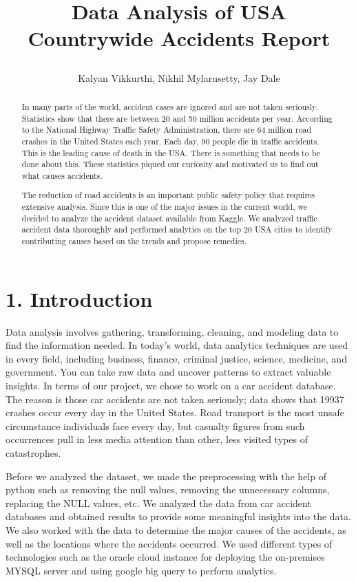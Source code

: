 \documentclass[10pt,twocolumn,letterpaper]{article}
\title{
		\usefont{OT1}{bch}{b}{n}
		
		\huge Data Analysis of USA Countrywide Accidents Report 
 \\
}
\author{ Kalyan Vikkurthi, Nikhil Mylarusetty, Jay Dale }
\begin{document}
\maketitle


\begin{abstract}
In many parts of the world, accident cases are ignored and are not taken seriously. Statistics show that there are between 20 and 50 million accidents per year. According to the National Highway Traffic Safety Administration, there are 64 million road crashes in the United States each year. Each day, 90 people die in traffic accidents. This is the leading cause of death in the USA. There is something that needs to be done about this. These statistics piqued our curiosity and motivated us to find out what causes accidents. 

The reduction of road accidents is an important public safety policy that requires extensive analysis. Since this is one of the major issues in the current world, we decided to analyze the accident dataset available from Kaggle. We analyzed traffic accident data thoroughly and performed analytics on the top 20 USA cities to identify contributing causes based on the trends and propose remedies.

\end{abstract} 

\section{1. Introduction}
Data analysis involves gathering, transforming, cleaning, and modeling data to find the information needed. In today's world, data analytics techniques are used in every field, including business, finance, criminal justice, science, medicine, and government. You can take raw data and uncover patterns to extract valuable insights.
In terms of our project, we chose to work on a car accident database. The reason is those car accidents are not taken seriously; data shows that 19937 crashes occur every day in the United States. Road transport is the most unsafe circumstance individuals face every day, but casualty figures from such occurrences pull in less media attention than other, less visited types of catastrophes.

Before we analyzed the dataset, we made the preprocessing with the help of python such as removing the null values, removing the unnecessary columns, replacing the NULL values, etc.  We analyzed the data from car accident databases and obtained results to provide some meaningful insights into the data. We also worked with the data to determine the major causes of the accidents, as well as the locations where the accidents occurred.  We used different types of technologies such as the oracle cloud instance for deploying the on-premises MYSQL server and using google big query to perform analytics.
\end{document}
